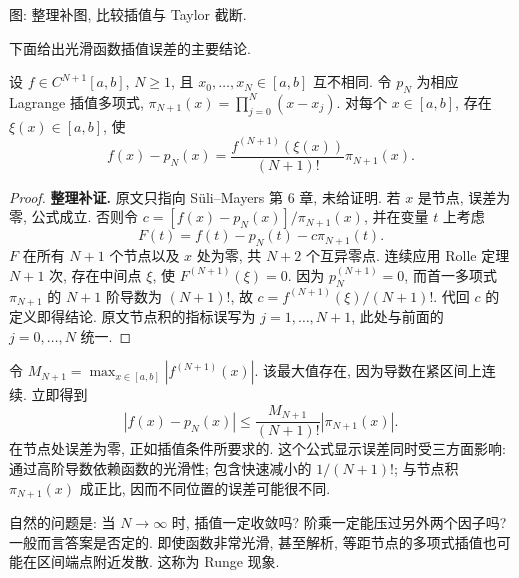 \begin{center}
\par 图: 整理补图, 比较插值与 Taylor 截断.
\end{center}

下面给出光滑函数插值误差的主要结论.

\begin{theorem}\label{thm:interpolation-remainder}
设 $f\in C^{N+1}[a,b]$, $N\geq1$, 且 $x_0,\ldots,x_N\in[a,b]$ 互不相同. 令 $p_N$ 为相应 Lagrange 插值多项式, $\pi_{N+1}(x)=\prod_{j=0}^{N}(x-x_j)$. 对每个 $x\in[a,b]$, 存在 $\xi(x)\in[a,b]$, 使
\begin{equation}\label{eq:interpolation-remainder}
f(x)-p_N(x)=\frac{f^{(N+1)}(\xi(x))}{(N+1)!}\pi_{N+1}(x).
\end{equation}
\end{theorem}
\begin{proof}
\textbf{整理补证.} 原文只指向 Süli--Mayers 第 6 章, 未给证明. 若 $x$ 是节点, 误差为零, 公式成立. 否则令 $c=[f(x)-p_N(x)]/\pi_{N+1}(x)$, 并在变量 $t$ 上考虑
\[
F(t)=f(t)-p_N(t)-c\pi_{N+1}(t).
\]
$F$ 在所有 $N+1$ 个节点以及 $x$ 处为零, 共 $N+2$ 个互异零点. 连续应用 Rolle 定理 $N+1$ 次, 存在中间点 $\xi$, 使 $F^{(N+1)}(\xi)=0$. 因为 $p_N^{(N+1)}=0$, 而首一多项式 $\pi_{N+1}$ 的 $N+1$ 阶导数为 $(N+1)!$, 故 $c=f^{(N+1)}(\xi)/(N+1)!$. 代回 $c$ 的定义即得结论. 原文节点积的指标误写为 $j=1,\ldots,N+1$, 此处与前面的 $j=0,\ldots,N$ 统一.
\end{proof}

令 $M_{N+1}=\max_{x\in[a,b]}|f^{(N+1)}(x)|$. 该最大值存在, 因为导数在紧区间上连续. 立即得到
\[
|f(x)-p_N(x)|\leq\frac{M_{N+1}}{(N+1)!}|\pi_{N+1}(x)|.
\]
在节点处误差为零, 正如插值条件所要求的. 这个公式显示误差同时受三方面影响: 通过高阶导数依赖函数的光滑性; 包含快速减小的 $1/(N+1)!$; 与节点积 $\pi_{N+1}(x)$ 成正比, 因而不同位置的误差可能很不同.

自然的问题是: 当 $N\to\infty$ 时, 插值一定收敛吗? 阶乘一定能压过另外两个因子吗? 一般而言答案是否定的. 即使函数非常光滑, 甚至解析, 等距节点的多项式插值也可能在区间端点附近发散. 这称为 Runge 现象.

